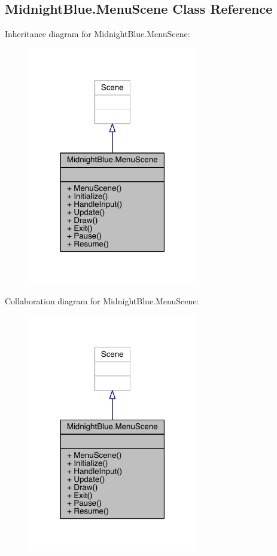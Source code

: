 \hypertarget{class_midnight_blue_1_1_menu_scene}{}\subsection{Midnight\+Blue.\+Menu\+Scene Class Reference}
\label{class_midnight_blue_1_1_menu_scene}


Inheritance diagram for Midnight\+Blue.\+Menu\+Scene\+:\nopagebreak
\begin{figure}[H]
\begin{center}
\leavevmode
\includegraphics[width=210pt]{class_midnight_blue_1_1_menu_scene__inherit__graph}
\end{center}
\end{figure}


Collaboration diagram for Midnight\+Blue.\+Menu\+Scene\+:\nopagebreak
\begin{figure}[H]
\begin{center}
\leavevmode
\includegraphics[width=210pt]{class_midnight_blue_1_1_menu_scene__coll__graph}
\end{center}
\end{figure}
